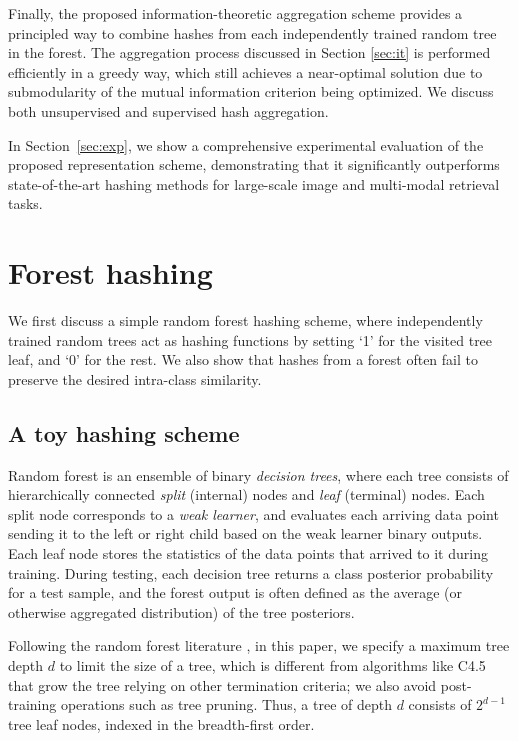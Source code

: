 \documentclass[runningheads]{llncs}
\begin{document}
Finally, the proposed information-theoretic aggregation scheme provides a
principled way to combine hashes from each independently trained random tree in
the forest. The aggregation process discussed in Section \ref{sec:it} is
performed efficiently in a greedy way, which still achieves a near-optimal
solution due to submodularity of the mutual information criterion being
optimized.  We discuss both unsupervised and supervised hash aggregation.

In Section~\ref{sec:exp}, we show a comprehensive experimental evaluation of the
proposed representation scheme, demonstrating that it significantly outperforms
state-of-the-art hashing methods for large-scale image and multi-modal retrieval
tasks.





\section{Forest hashing}
\label{sec:thm}

We first discuss a simple random forest hashing scheme, where independently
trained random trees act as hashing functions by setting `1' for the visited
tree leaf, and `0' for the rest.  We also show that hashes from a forest often
fail to preserve the desired intra-class similarity.


\subsection{A toy hashing scheme}

{Random forest} \cite{RF2001, RFBook} is an ensemble of binary \emph{decision
  trees}, where each tree consists of hierarchically connected \emph{split}
(internal) nodes and \emph{leaf} (terminal) nodes.  Each split node corresponds
to a \emph{weak learner}, and evaluates each arriving data point sending it to
the left or right child based on the weak learner binary outputs.  Each leaf
node stores the statistics of the data points that arrived to it during
training.  During testing, each decision tree returns a class posterior
probability for a test sample, and the forest output is often defined as the
average (or otherwise aggregated distribution) of the tree posteriors.

Following the random forest literature \cite{RFBook}, in this paper, we specify
a maximum tree depth $d$ to limit the size of a tree, which is different from
algorithms like C4.5 \cite{c4.5} that grow the tree relying on other termination
criteria; we also avoid post-training operations such as tree pruning. Thus, a
tree of depth $d$ consists of $2^{d-1}$ tree leaf nodes, indexed in the
breadth-first order.
\end{document}
